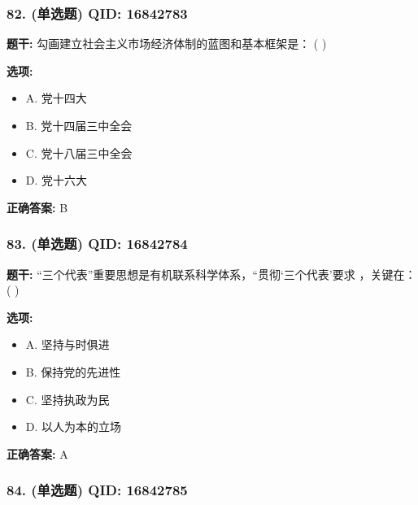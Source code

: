 \documentclass[12pt,UTF8]{ctexart}
\begin{document}
\subsubsection*{82. (单选题) \small QID: 16842783}

\textbf{题干:}
勾画建立社会主义市场经济体制的蓝图和基本框架是： ( )

\textbf{选项:}
\begin{itemize}[leftmargin=*]

  \item A. 党十四大

  \item B. 党十四届三中全会

  \item C. 党十八届三中全会

  \item D. 党十六大

\end{itemize}

\textbf{正确答案:}
B

\vspace{0.3em}\hrulefill\vspace{0.7em}

\subsubsection*{83. (单选题) \small QID: 16842784}

\textbf{题干:}
“三个代表”重要思想是有机联系科学体系，“贯彻‘三个代表’要求 ，关键在： ( )

\textbf{选项:}
\begin{itemize}[leftmargin=*]

  \item A. 坚持与时俱进

  \item B. 保持党的先进性

  \item C. 坚持执政为民

  \item D. 以人为本的立场

\end{itemize}

\textbf{正确答案:}
A

\vspace{0.3em}\hrulefill\vspace{0.7em}

\subsubsection*{84. (单选题) \small QID: 16842785}
\end{document}
